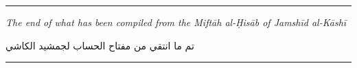 \documentclass[11pt,a4paper]{article}
\newcommand{\shortline}{\noindent\rule{0.5\textwidth}{0.4pt}\par}
\newcommand{\ar}[1]{{\arabicfont\beginR #1\endR}}
\begin{document}
\vspace{0.5cm}

\begin{center}
\shortline

\vspace{0.5cm}

\textit{The end of what has been compiled from the \textit{Mift\=ah
al-\d{H}is\=ab} of Jamsh\=id al-K\=ash\=i}

\vspace{0.3cm}

\ar{تم ما انتقي من مفتاح الحساب لجمشيد الكاشي}

\vspace{0.5cm}

\shortline
\end{center}
\end{document}
